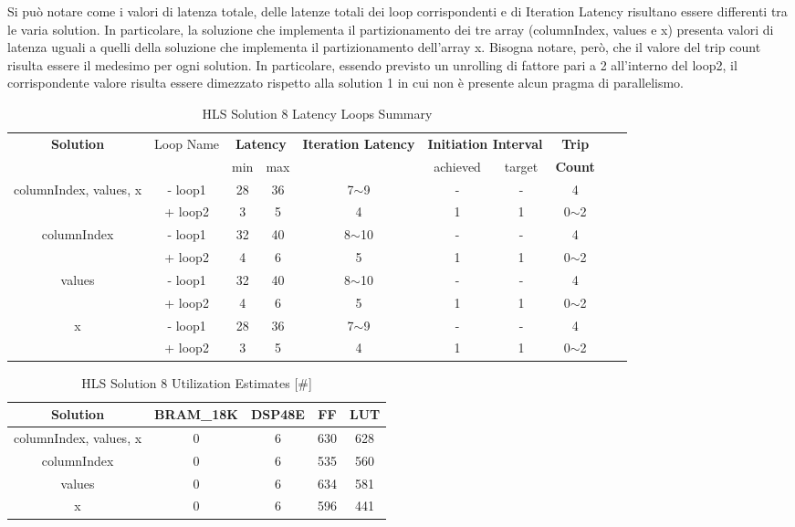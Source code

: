 Si può notare come i valori di latenza totale, delle latenze totali dei loop corrispondenti e di Iteration Latency risultano essere differenti tra le varia solution. In particolare, la soluzione che implementa il partizionamento dei tre array (columnIndex, values e x) presenta valori di latenza uguali a quelli della soluzione che implementa il partizionamento dell'array x. Bisogna notare, però, che il valore del trip count risulta essere il medesimo per ogni solution. In particolare, essendo previsto un unrolling di fattore pari a 2 all'interno del loop2, il corrispondente valore risulta essere dimezzato rispetto alla solution 1 in cui non è presente alcun pragma di parallelismo. 

\begin{table}[H]
	\centering
	\begin{tabular}{|c|c|c|c|c|c|c|c|c|c|}
		\hline
		\multicolumn{1}{|c|}{\textbf{Solution}} & \multicolumn{1}{|c|}{Loop Name} & \multicolumn{2}{|c|}{\textbf{Latency}} & \multicolumn{1}{c|}{\textbf{Iteration Latency}} & \multicolumn{2}{c|}{\textbf{Initiation Interval}} & \multicolumn{1}{c|}{\textbf{Trip}}  \\
		&  & min & max & & achieved & target & \textbf{Count} \\
		\hline
		columnIndex, values, x & - loop1 & 28 & 36 & 7$\sim$9 & - & - & 4 \\
		& + loop2 & 3 & 5 & 4 & 1 & 1 & 0$\sim$2 \\
		\hline
		columnIndex & - loop1 & 32 & 40 & 8$\sim$10 & - & - & 4 \\
		& + loop2 & 4 & 6 & 5 & 1 & 1 & 0$\sim$2 \\
		\hline
		values & - loop1 & 32 & 40 & 8$\sim$10 & - & - & 4 \\
		& + loop2 & 4 & 6 & 5 & 1 & 1 & 0$\sim$2 \\
		\hline
		x & - loop1 & 28 & 36 & 7$\sim$9 & - & - & 4 \\
		& + loop2 & 3 & 5 & 4 & 1 & 1 & 0$\sim$2 \\
		\hline
	\end{tabular}
	\caption{HLS Solution 8 Latency Loops Summary }
	\label{tab:hls-solution-8-loop-summary}
\end{table}

\begin{table}[H]
	\centering
	\begin{tabular}{|c|c|c|c|c|}
		\hline
		\textbf{Solution} & \textbf{BRAM\_18K} & \textbf{DSP48E} & \textbf{FF} & \textbf{LUT} \\
		\hline
		columnIndex, values, x & 0 & 6 & 630 & 628 \\
		\hline
		columnIndex & 0 & 6 & 535 & 560 \\
		\hline
		values & 0 & 6 & 634 & 581 \\
		\hline
		x & 0 & 6 & 596 & 441 \\
		\hline
	\end{tabular}
	\caption{HLS Solution 8 Utilization Estimates [\#]}
	\label{tab:hls-solution-8-utilization-report}
\end{table}

